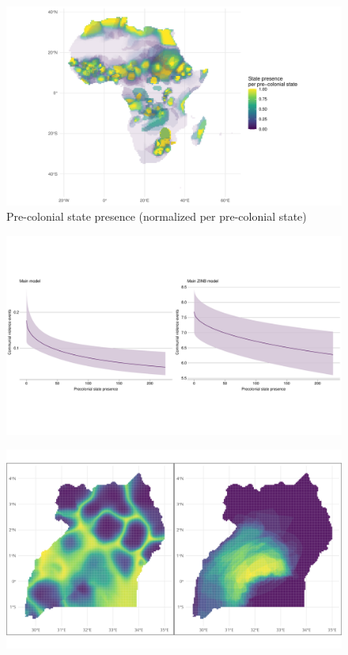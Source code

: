 \documentclass{beamer}
\begin{document}

\begin{frame}
	\begin{figure}
		\includegraphics[width=\textwidth]{img/geo_isd_all.pdf}
		\caption{Pre-colonial state presence (normalized per pre-colonial state)}
	\end{figure}

\end{frame}


\begin{frame}
\end{frame}


\begin{frame}
	\begin{figure}
		\includegraphics[width=1\linewidth]{R/Output/mainplots.pdf}
	\end{figure}
\end{frame}

\begin{frame}
	\begin{figure}
		\includegraphics[width=1\linewidth]{img/ugaplots.png}
	\end{figure}
\end{frame}
\end{document}
